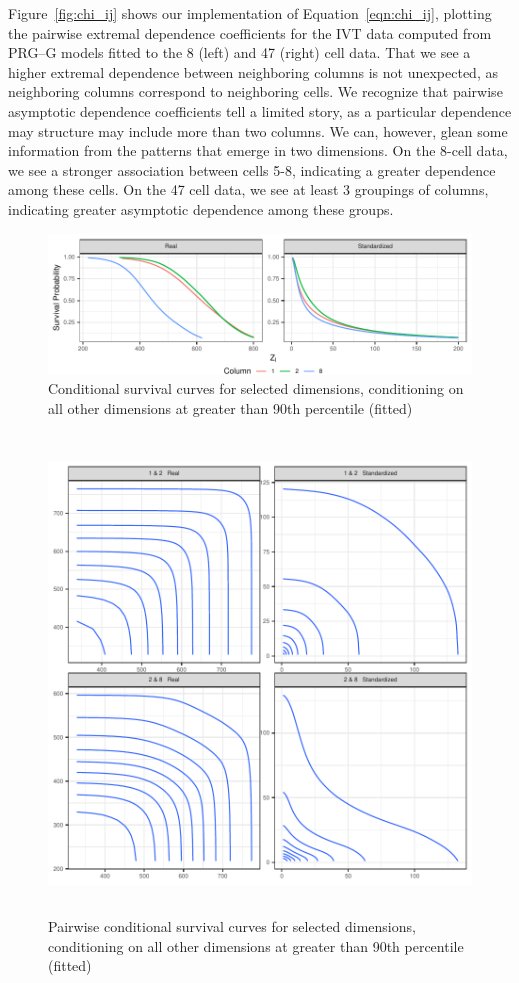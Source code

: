 Figure~\ref{fig:chi_ij} shows our implementation of Equation~\ref{eqn:chi_ij}, plotting the 
  pairwise extremal dependence coefficients for the IVT data computed from PRG--G models 
  fitted to the 8 (left) and 47 (right) cell data.  
  That we see a higher extremal dependence between neighboring columns is not unexpected, as
  neighboring columns correspond to neighboring cells.  We recognize that pairwise asymptotic
  dependence coefficients tell a limited story, as a particular dependence may structure may include
  more than two columns.   We can, however, glean some information from the patterns that emerge in
  two dimensions.  On the 8-cell data, we see a stronger association between cells 5-8, indicating a
  greater dependence among these cells.  On the 47 cell data, we see at least 3 groupings of columns,
  indicating greater asymptotic dependence among these groups.

\begin{figure}[ht]
    \centering
    \caption{Conditional survival curves for selected dimensions, conditioning on all other dimensions at greater than 90th percentile (fitted)\label{fig:condsurv1d}}
    \includegraphics{./images/condsurv_1d}
\end{figure}

\begin{figure}[htb]
    \centering
    \caption{Pairwise conditional survival curves for selected dimensions, conditioning on all other dimensions at greater than 90th percentile (fitted)\label{fig:condsurv2d}}
    \includegraphics[height=5in, width=5in]{./images/condsurv_2d}
\end{figure}

